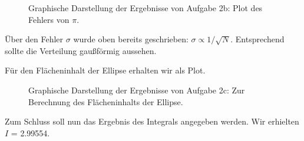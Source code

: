 \begin{landscape}
	\begin{figure}
		\caption{Graphische Darstellung der Ergebnisse von Aufgabe 2b: Plot des Fehlers von $\pi$.}
		\label{fig:2bplot}
	\end{figure}
\end{landscape}
Über den Fehler $\sigma$ wurde oben bereits geschrieben: $\sigma \propto 1/\sqrt{N}$. Entsprechend sollte die Verteilung gaußförmig aussehen.

Für den Flächeninhalt der Ellipse erhalten wir als Plot.
\begin{landscape}
	\begin{figure}
		\caption{Graphische Darstellung der Ergebnisse von Aufgabe 2c: Zur Berechnung des Flächeninhalts der Ellipse.}
		\label{fig:1b}
	\end{figure}
\end{landscape}

Zum Schluss soll nun das Ergebnis des Integrals angegeben werden. Wir erhielten \\$I$ = 2.99554.


